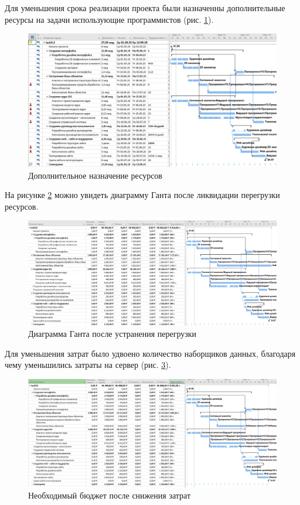 Для уменьшения срока реализации проекта были назначенны дополнительные ресурсы на задачи использующие программистов (рис. \ref{p8}).

\newpage
\begin{figure}[!h]
	\centering
	\includegraphics[width=1\linewidth]{inc/img/8.png}
	\caption{Дополнительное назначение ресурсов}
	\label{p8}
\end{figure}

На рисунке \ref{p9} можно увидеть диаграмму Ганта после ликвидации перегрузки ресурсов.

\begin{figure}[!h]
	\centering
	\includegraphics[width=1\linewidth]{inc/img/9.png}
	\caption{Диаграмма Ганта после устранения перегрузки}
	\label{p9}
\end{figure}

\newpage
Для уменьшения затрат было удвоено количество наборщиков данных, благодаря чему уменьшились затраты на сервер (рис. \ref{p10}).

\begin{figure}[!h]
	\centering
	\includegraphics[width=1\linewidth]{inc/img/10.png}
	\caption{Необходимый бюджет после снижения затрат}
	\label{p10}
\end{figure}

